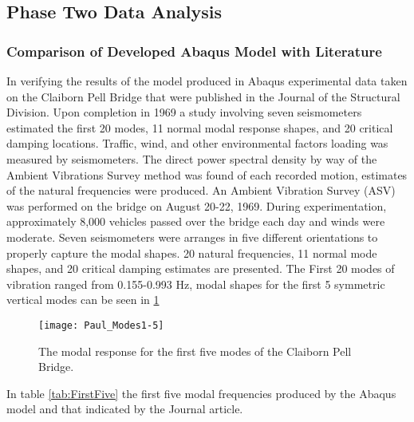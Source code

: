\subsection{Phase Two Data Analysis}

\subsubsection{Comparison of Developed Abaqus Model with Literature}


In verifying the results of the model produced in Abaqus experimental data taken on the Claiborn Pell Bridge that were published in the Journal of the
Structural Division. Upon completion in 1969 a study involving seven seismometers estimated the first 20 modes, 11 normal modal response shapes, and 20
critical damping locations. Traffic, wind, and other environmental factors loading was measured by seismometers. The direct power spectral density by
way of the Ambient Vibrations Survey method was found of each recorded motion, estimates of the natural frequencies were produced. An Ambient Vibration
Survey (ASV) was performed on the bridge on August 20-22, 1969. During experimentation, approximately 8,000 vehicles passed over the bridge each day
and winds were moderate. Seven seismometers were arranges in five different orientations to properly capture the modal shapes. 20 natural
frequencies, 11 normal mode shapes, and 20 critical damping estimates are presented. The First 20 modes of vibration ranged from 0.155-0.993 Hz,
modal shapes for the first 5 symmetric vertical modes can be seen in \ref{fig:Paul_Modes1-5}\\

\begin{figure}

\centering

\texttt{[image: Paul\_Modes1-5]}

\caption{The modal response for the first five modes of the Claiborn Pell Bridge.}

\label{fig:Paul_Modes1-5}

\end{figure}

In table \ref{tab:FirstFive} the first five modal frequencies
 produced by the Abaqus model and that indicated by the Journal
  article.  


